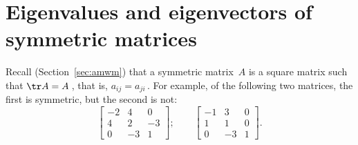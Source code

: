 
\chapter{Eigenvalues and eigenvectors of symmetric matrices}
\label{ch:eesm}
\minitoc

Recall (Section~\ref{sec:amwm}) that a symmetric matrix~\(A\) is a square matrix such that \(\tr A=A\)\,, that is, \(a_{ij}=a_{ji}\)\,.
For example, of the following two matrices, the first is symmetric, but the second is not:
\begin{equation*}
\begin{bmatrix} -2&4&0
\\4&2&-3
\\0&-3&1 \end{bmatrix};\qquad
\begin{bmatrix} -1&3&0
\\1&1&0
\\0&-3&1 \end{bmatrix}.
\end{equation*}


